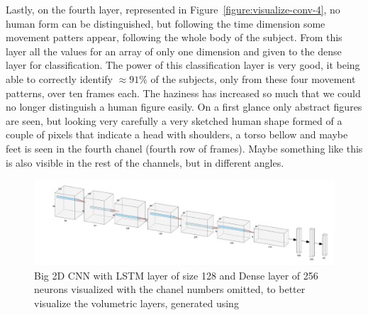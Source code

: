 \documentclass[12pt]{article}
\theoremstyle{definition}
\begin{document}
	Lastly, on the fourth layer, represented in Figure~\ref{figure:visualize-conv-4}, no human form can be distinguished, but following the time dimension some movement patters appear, following the whole body of the subject. From this layer all the values for an array of only one dimension and given to the dense layer for classification. The power of this classification layer is very good, it being able to correctly identify $\approx 91\%$ of the subjects, only from these four movement patterns, over ten frames each. The haziness has increased so much that we could no longer distinguish a human figure easily. On a first glance only abstract figures are seen, but looking very carefully a very sketched human shape formed of a couple of pixels that indicate a head with shoulders, a torso bellow and maybe feet is seen in the fourth chanel (fourth row of frames). Maybe something like this is also visible in the rest of the channels, but in different angles.

	\begin{figure}[ht]
		\includegraphics[width=\textwidth]{networks/big-2D-CNN-LSTM-Dense.png}
		\caption{Big 2D CNN with LSTM layer of size 128 and Dense layer of 256 neurons visualized with the chanel numbers omitted, to better visualize the volumetric layers, generated using \cite{nn-svg}}
		\label{figure:big-2D-CNN-LSTM-Dense}
	\end{figure}
\end{document}
